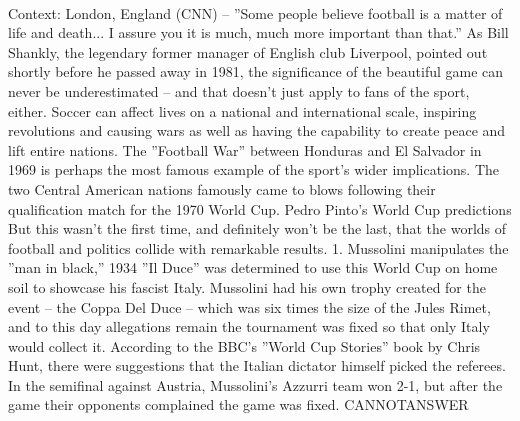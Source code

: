 \documentclass[11pt,a4paper, onecolumn]{article}
\begin{document}
\\ Context: London, England (CNN) -- ''Some people believe football is a matter of life and death... I assure you it is much, much more important than that.'' As Bill Shankly, the legendary former manager of English club Liverpool, pointed out shortly before he passed away in 1981, the significance of the beautiful game can never be underestimated -- and that doesn't just apply to fans of the sport, either. Soccer can affect lives on a national and international scale, inspiring revolutions and causing wars as well as having the capability to create peace and lift entire nations. The ''Football War'' between Honduras and El Salvador in 1969 is perhaps the most famous example of the sport's wider implications. The two Central American nations famously came to blows following their qualification match for the 1970 World Cup. Pedro Pinto's World Cup predictions But this wasn't the first time, and definitely won't be the last, that the worlds of football and politics collide with remarkable results. 1. Mussolini manipulates the ''man in black,'' 1934 ''Il Duce'' was determined to use this World Cup on home soil to showcase his fascist Italy. Mussolini had his own trophy created for the event -- the Coppa Del Duce -- which was six times the size of the Jules Rimet, and to this day allegations remain the tournament was fixed so that only Italy would collect it. According to the BBC's ''World Cup Stories'' book by Chris Hunt, there were suggestions that the Italian dictator himself picked the referees. In the semifinal against Austria, Mussolini's Azzurri team won 2-1, but after the game their opponents complained the game was fixed. CANNOTANSWER
\end{document}
